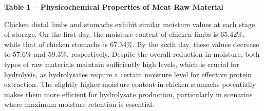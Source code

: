{\bfseries Table 1 -- Physicochemical Properties of Meat Raw Material}

% 
% 
% 
% 
% 
% 
% 
% 
% 
% 
% 
% 
% 
% 
% 
% 
% 
% 
% 
% 
% 
% 
% 
% 
% 
% 
% 

Chicken distal limbs and stomachs exhibit similar moisture values at
each stage of storage. On the first day, the moisture content of chicken
limbs is 65.42\%, while that of chicken stomachs is 67.34\%. By the
sixth day, these values decrease to 57.6\% and 59.3\%, respectively.
Despite the overall reduction in moisture, both types of raw materials
maintain sufficiently high levels, which is crucial for hydrolysis, as
hydrolysates require a certain moisture level for effective protein
extraction. The slightly higher moisture content in chicken stomachs
potentially makes them more efficient for hydrolysate production,
particularly in scenarios where maximum moisture retention is essential.

